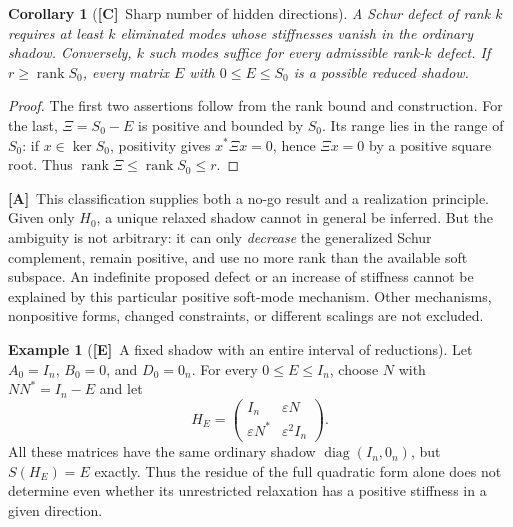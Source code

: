 \documentclass[11pt,oneside]{article}
\numberwithin{equation}{section}
\theoremstyle{plain}
\newtheorem{corollary}[corollary]{Corollary}
\theoremstyle{definition}
\newtheorem{example}[example]{Example}
\theoremstyle{remark}
\DeclareMathOperator{\diag}{diag}
\DeclareMathOperator{\rank}{rank}
\newcommand{\TE}{\textcolor{TierE}{\textsf{\bfseries[E]}}}
\newcommand{\TC}{\textcolor{TierC}{\textsf{\bfseries[C]}}}
\newcommand{\TA}{\textcolor{TierA}{\textsf{\bfseries[A]}}}
\begin{document}
\begin{corollary}[\TC\ Sharp number of hidden directions]\label{qgs:ops:cor:rank-cost}
A Schur defect of rank $k$ requires at least $k$ eliminated modes whose stiffnesses vanish in the ordinary shadow. Conversely, $k$ such modes suffice for every admissible rank-$k$ defect. If $r\ge\rank S_0$, every matrix $E$ with $0\le E\le S_0$ is a possible reduced shadow.
\end{corollary}
\begin{proof}
The first two assertions follow from the rank bound and construction. For the last, $\Xi=S_0-E$ is positive and bounded by $S_0$. Its range lies in the range of $S_0$: if $x\in\ker S_0$, positivity gives $x^*\Xi x=0$, hence $\Xi x=0$ by a positive square root. Thus $\rank\Xi\le\rank S_0\le r$.
\end{proof}

\TA\ This classification supplies both a no-go result and a realization principle. Given only $H_0$, a unique relaxed shadow cannot in general be inferred. But the ambiguity is not arbitrary: it can only \emph{decrease} the generalized Schur complement, remain positive, and use no more rank than the available soft subspace. An indefinite proposed defect or an increase of stiffness cannot be explained by this particular positive soft-mode mechanism. Other mechanisms, nonpositive forms, changed constraints, or different scalings are not excluded.

\begin{example}[\TE\ A fixed shadow with an entire interval of reductions]\label{qgs:ops:ex:interval}
Let $A_0=I_n$, $B_0=0$, and $D_0=0_n$. For every $0\le E\le I_n$, choose $N$ with $NN^*=I_n-E$ and let
\[
 H_E=\begin{pmatrix}I_n&\varepsilon N\\
                    \varepsilon N^*&\varepsilon^2I_n\end{pmatrix}.
\]
All these matrices have the same ordinary shadow $\diag(I_n,0_n)$, but $S(H_E)=E$ exactly. Thus the residue of the full quadratic form alone does not determine even whether its unrestricted relaxation has a positive stiffness in a given direction.
\end{example}
\end{document}
